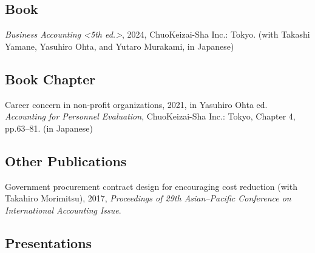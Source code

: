 \documentclass[letterpaper,uplatex]{article}
\renewenvironment{itemize}{
  \begin{list}{}{
    \setlength{\leftmargin}{1.5em}
  }
}{
  \end{list}
}
\begin{document}
\subsection*{Book}

\begin{itemize}
    \item \textit{Business Accounting <5th ed.>}, 2024, ChuoKeizai-Sha Inc.: Tokyo. (with Takashi Yamane, Yasuhiro Ohta, and Yutaro Murakami, in Japanese)
\end{itemize}

\subsection*{Book Chapter}

\begin{itemize}
	\item Career concern in non-profit organizations, 2021, in Yasuhiro Ohta ed. \textit{Accounting for Personnel Evaluation}, ChuoKeizai-Sha Inc.: Tokyo, Chapter 4, pp.63--81. (in Japanese)
\end{itemize}


\subsection*{Other Publications}

\begin{itemize}
	\item Government procurement contract design for encouraging cost reduction (with Takahiro Morimitsu), 2017, \textit{Proceedings of 29th Asian--Pacific Conference on International Accounting Issue}.
\end{itemize}

\subsection*{Presentations}
\end{document}
